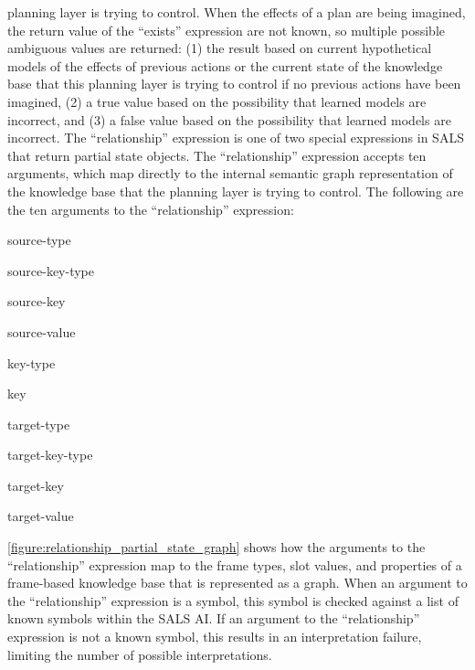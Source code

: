 planning layer is trying to control.  When the effects of a plan are
being imagined, the return value of the ``exists'' expression are not
known, so multiple possible ambiguous values are returned: (1) the
result based on current hypothetical models of the effects of previous
actions or the current state of the knowledge base that this planning
layer is trying to control if no previous actions have been imagined,
(2) a true value based on the possibility that learned models are
incorrect, and (3) a false value based on the possibility that learned
models are incorrect.  The ``relationship'' expression is one of two
special expressions in SALS that return partial state objects.  The
``relationship'' expression accepts ten arguments, which map directly
to the internal semantic graph representation of the knowledge base
that the planning layer is trying to control.  The following are the
ten arguments to the ``relationship'' expression:
\begin{packed_enumerate}
\item{source-type}
\item{source-key-type}
\item{source-key}
\item{source-value}
\item{key-type}
\item{key}
\item{target-type}
\item{target-key-type}
\item{target-key}
\item{target-value}
\end{packed_enumerate}
{\mbox{\autoref{figure:relationship_partial_state_graph}}} shows how
the arguments to the ``relationship'' expression map to the frame
types, slot values, and properties of a frame-based knowledge base
that is represented as a graph.  When an argument to the
``relationship'' expression is a symbol, this symbol is checked
against a list of known symbols within the SALS AI.  If an argument to
the ``relationship'' expression is not a known symbol, this results in
an interpretation failure, limiting the number of possible
interpretations.
